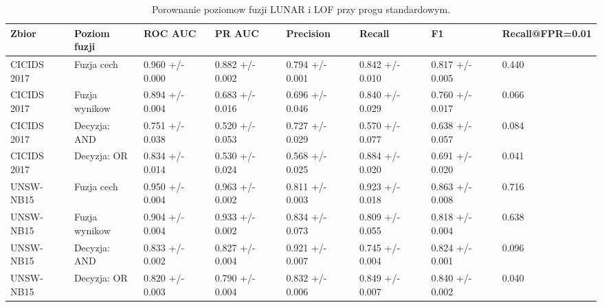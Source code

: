 \begin{table}
\caption{Porownanie poziomow fuzji LUNAR i LOF przy progu standardowym.}
\label{tab:fusion_levels}
\begin{tabular}{llllllll}
\toprule
Zbior & Poziom fuzji & ROC AUC & PR AUC & Precision & Recall & F1 & Recall@FPR=0.01 \\
\midrule
CICIDS 2017 & Fuzja cech & 0.960 +/- 0.000 & 0.882 +/- 0.002 & 0.794 +/- 0.001 & 0.842 +/- 0.010 & 0.817 +/- 0.005 & 0.440 \\
CICIDS 2017 & Fuzja wynikow & 0.894 +/- 0.004 & 0.683 +/- 0.016 & 0.696 +/- 0.046 & 0.840 +/- 0.029 & 0.760 +/- 0.017 & 0.066 \\
CICIDS 2017 & Decyzja: AND & 0.751 +/- 0.038 & 0.520 +/- 0.053 & 0.727 +/- 0.029 & 0.570 +/- 0.077 & 0.638 +/- 0.057 & 0.084 \\
CICIDS 2017 & Decyzja: OR & 0.834 +/- 0.014 & 0.530 +/- 0.024 & 0.568 +/- 0.025 & 0.884 +/- 0.020 & 0.691 +/- 0.020 & 0.041 \\
UNSW-NB15 & Fuzja cech & 0.950 +/- 0.004 & 0.963 +/- 0.002 & 0.811 +/- 0.003 & 0.923 +/- 0.018 & 0.863 +/- 0.008 & 0.716 \\
UNSW-NB15 & Fuzja wynikow & 0.904 +/- 0.004 & 0.933 +/- 0.002 & 0.834 +/- 0.073 & 0.809 +/- 0.055 & 0.818 +/- 0.004 & 0.638 \\
UNSW-NB15 & Decyzja: AND & 0.833 +/- 0.002 & 0.827 +/- 0.004 & 0.921 +/- 0.007 & 0.745 +/- 0.004 & 0.824 +/- 0.001 & 0.096 \\
UNSW-NB15 & Decyzja: OR & 0.820 +/- 0.003 & 0.790 +/- 0.004 & 0.832 +/- 0.006 & 0.849 +/- 0.007 & 0.840 +/- 0.002 & 0.040 \\
\bottomrule
\end{tabular}
\end{table}
